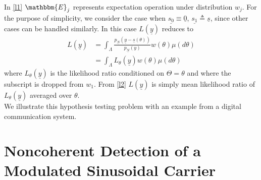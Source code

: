 \documentclass[12pt]{report}
\begin{document}
	In \eqref{l1} $\mathbbm{E}_j$ represents expectation operation under distribution $w_j$. For the purpose of simplicity, we consider the case when $\underline{s_0} \equiv 
	\underline{0}$, $\underline{s_1} \triangleq \underline{s}$, since other cases can be handled similarly. In this case $L(\underline{y})$ reduces to 
	\begin{equation}
	\label{l2}
	\begin{aligned}
	L(\underline{y}) &= \int_{\Lambda} \frac{p_{\underline{N}}(\underline{y} - \underline{s}(\theta))}{p_{\underline{N}}(y)} w(\theta) \mu (d\theta)\\
	&= \int_{\Lambda} L_{\theta}(\underline{y}) w(\theta) \mu (d\theta) 	 
	\end{aligned}
	\end{equation}
	where $L_{\theta} (\underline{y})$ is the likelihood ratio conditioned on $\Theta = \theta$ and where the subscript is dropped from $w_1$. From \eqref{l2} $L(\underline{y})$ is simply mean likelihood ratio of $L_{\theta} (\underline{y})$ averaged over $\theta$.
	\\
	We illustrate this hypothesis testing problem with an example from a digital communication system.
	
	\section{Noncoherent Detection of a Modulated Sinusoidal Carrier}
	
\end{document}
